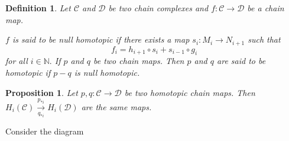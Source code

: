 \documentclass[11pt]{amsart}
\newtheorem{defn}[theorem]{Definition}
\newtheorem{prop}[theorem]{Proposition}
\newcommand{\NN}{\mathbb N}
\DeclareMathOperator{\Ker}{\text{Ker}}
\begin{document}
\begin{defn}

Let $\mathcal{C}$ and $\mathcal{D}$ be two chain complexes and $f:\mathcal{C}\to \mathcal{D}$ be a chain map.

\begin{center}


\end{center}

$f$ is said to be null homotopic if there exists a map $s_i:M_i\to N_{i+1}$ such that $$f_i=h_{i+1}\circ s_i+s_{i-1}\circ g_i$$ for all $i\in{\NN}.$ If $p$ and $q$ be two chain maps. Then $p$ and $q$ are said to be homotopic if $p-q$ is null homotopic.

\end{defn}

\begin{prop}

Let $p,q:\mathcal{C}\to \mathcal{D}$ be two homotopic chain maps. Then $H_i(\mathcal{C})\xrightarrow[q_{*i}]{p_{*i}} H_i(\mathcal{D})$ are the same maps.

\end{prop}

\proof Consider the diagram \begin{center}


\end{center}
\end{document}
